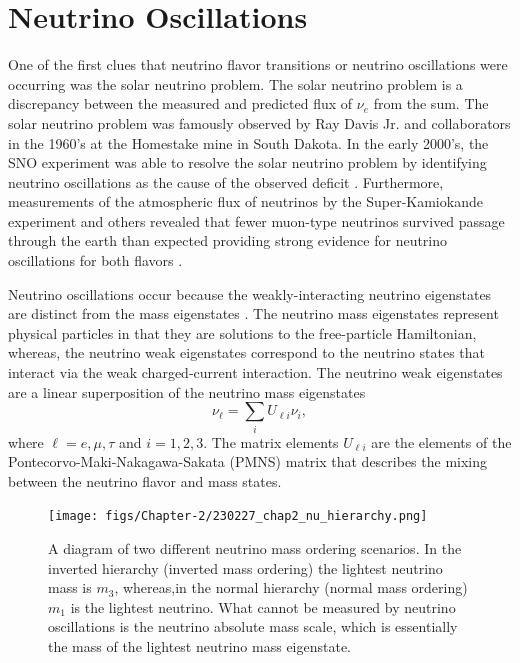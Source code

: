 \section{Neutrino Oscillations}
\label{sec:chap2-nu-oscillation}

One of the first clues that neutrino flavor transitions or neutrino oscillations were occurring was the solar neutrino problem. The solar neutrino problem is a discrepancy between the measured and predicted flux of $\nu_e$ from the sum. The solar neutrino problem was famously observed by Ray Davis Jr. and collaborators in the 1960's \cite{ray_davis} at the Homestake mine in South Dakota. In the early 2000's, the SNO experiment was able to resolve the solar neutrino problem by identifying neutrino oscillations as the cause of the observed deficit \cite{SNO}. Furthermore, measurements of the atmospheric flux of neutrinos by the Super-Kamiokande experiment and others revealed that fewer muon-type neutrinos survived passage through the earth than expected providing strong evidence for neutrino oscillations for both flavors \cite{superk}.

Neutrino oscillations occur because the weakly-interacting neutrino eigenstates are distinct from the mass eigenstates \cite{nu_oscillations}. The neutrino mass eigenstates represent physical particles in that they are solutions to the free-particle Hamiltonian, whereas, the neutrino weak eigenstates correspond to the neutrino states that interact via the weak charged-current interaction. The neutrino weak eigenstates are a linear superposition of the neutrino mass eigenstates
\begin{equation}
    \nu_\ell=\sum_i{U_{\ell i}\nu_i},
\end{equation}
where $\ell=e,\mu,\tau$ and $i=1,2,3$. The matrix elements $U_{\ell i}$ are the elements of the Pontecorvo-Maki-Nakagawa-Sakata (PMNS) matrix that describes the mixing between the neutrino flavor and mass states.

\begin{figure}[htbp]
    \centering
    \texttt{[image: figs/Chapter-2/230227\_chap2\_nu\_hierarchy.png]}
    \caption{A diagram of two different neutrino mass ordering scenarios. In the inverted hierarchy (inverted mass ordering) the lightest neutrino mass is $m_3$, whereas,in the normal hierarchy (normal mass ordering) $m_1$ is the lightest neutrino. What cannot be measured by neutrino oscillations is the neutrino absolute mass scale, which is essentially the mass of the lightest neutrino mass eigenstate.}
    \label{fig:chap2-nu-hierarchy}
\end{figure}

